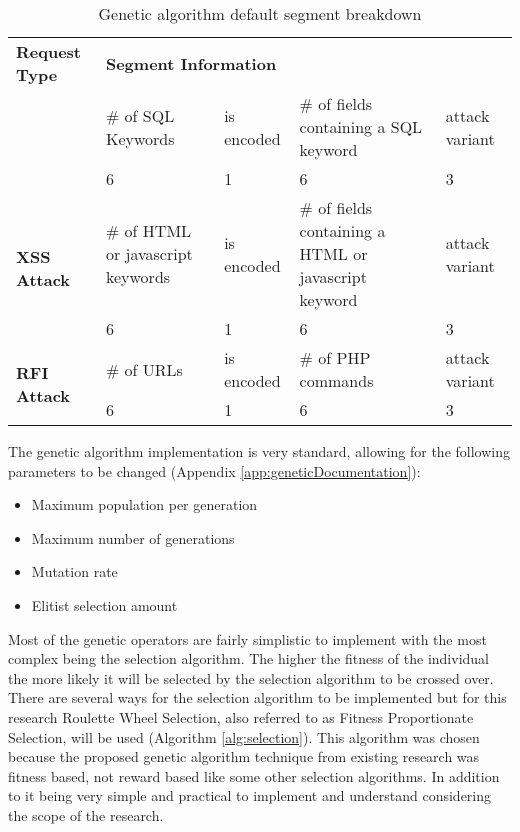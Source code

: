 \begin{table}
	\begin{tabular}{|p{1.25in}|p{1in}|p{1in}|p{1in}|p{1in}|}
	\hline
	\multicolumn{1}{|p{1.25in}|}{\textbf{Request Type}} & \multicolumn{4}{p{4in}|}{\textbf{Segment Information}} \\ \hhline{|=|=|=|=|=|}
	\multirow{2}{*}{\textbf{SQL Injection}}            & \# of SQL Keywords & is encoded & \# of fields containing a SQL keyword & attack variant \\ \cline{2-5} 
		                                      & 6             & 1          & 6            & 3 \\ \hline  
	\multirow{2}{*}{\textbf{XSS Attack}}               & \# of HTML or javascript keywords & is encoded & \# of fields containing a HTML or javascript keyword & attack variant \\ \cline{2-5} 
		                                      & 6             & 1          & 6            & 3 \\ \hline
	\multirow{2}{*}{\textbf{RFI Attack}}               & \# of URLs & is encoded & \# of PHP commands & attack variant \\ \cline{2-5} 
		                                      & 6             & 1          & 6            & 3 \\ \hline  
	\end{tabular}
	\caption{Genetic algorithm default segment breakdown}
	\label{tab:geneticSegments}
\end{table}

The genetic algorithm implementation is very standard, allowing for the following parameters to be changed (Appendix \ref{app:geneticDocumentation}):

\begin{itemize}
	\item Maximum population per generation
	\item Maximum number of generations
	\item Mutation rate
	\item Elitist selection amount
\end{itemize}

Most of the genetic operators are fairly simplistic to implement with the most complex being the selection algorithm.  The higher the fitness of the individual the more likely it will be selected by the selection algorithm to be crossed over.  There are several ways for the selection algorithm to be implemented but for this research Roulette Wheel Selection, also referred to as Fitness Proportionate Selection, will be used (Algorithm \ref{alg:selection}).  This algorithm was chosen because the proposed genetic algorithm technique from existing research was fitness based\cite{mainPaper}, not reward based like some other selection algorithms.  In addition to it being very simple and practical to implement and understand considering the scope of the research.

